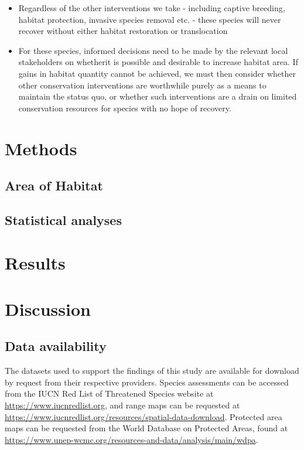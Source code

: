 \documentclass[
  12pt,
  british,
  a4paper,
]{article}
\begin{document}
\begin{itemize}
\item
  Regardless of the other interventions we take - including captive breeding, habitat protection, invasive species removal etc. - these species will never recover without either habitat restoration or translocation
\item
  For these species, informed decisions need to be made by the relevant local stakeholders on whetherit is possible and desirable to increase habitat area. If gains in habitat quantity cannot be achieved, we must then consider whether other conservation interventions are worthwhile purely as a means to maintain the status quo, or whether such interventions are a drain on limited conservation resources for species with no hope of recovery.
\end{itemize}

\hypertarget{methods}{%
\section{Methods}\label{methods}}

\hypertarget{area-of-habitat}{%
\subsection{Area of Habitat}\label{area-of-habitat}}

\hypertarget{statistical-analyses}{%
\subsection{Statistical analyses}\label{statistical-analyses}}

\hypertarget{results}{%
\section{Results}\label{results}}

\hypertarget{discussion}{%
\section{Discussion}\label{discussion}}

\hypertarget{data-availability}{%
\subsection{Data availability}\label{data-availability}}

The datasets used to support the findings of this study are available for download by request from their respective providers. Species assessments can be accessed from the IUCN Red List of Threatened Species website at \url{https://www.iucnredlist.org}, and range maps can be requested at \url{https://www.iucnredlist.org/resources/spatial-data-download}. Protected area maps can be requested from the World Database on Protected Areas, found at \url{https://www.unep-wcmc.org/resources-and-data/analysis/main/wdpa}.
\end{document}
